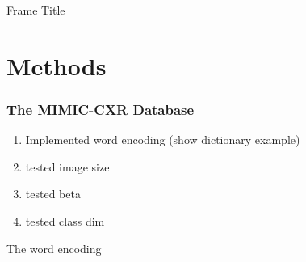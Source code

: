             \begin{frame}{Frame Title}


            \end{frame}

    \section{Methods}
        \subsubsection{The MIMIC-CXR Database}

            \begin{frame}
                \begin{enumerate}
                    \item Implemented word encoding (show dictionary example)
                    \item tested image size
                    \item tested beta
                    \item tested class dim
                \end{enumerate}
            \end{frame}

            \begin{frame}
            \end{frame}

            \begin{frame}{The word encoding}

            \end{frame}
\printbibliography


